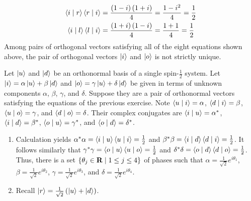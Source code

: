 \begin{answer}
\begin{align*}
		\braket{i \mid r} \braket{r \mid i} & = \frac{\left(1 -i\right)\left(1 + i\right)}{4} = \frac{1 - i^2}{4} = \frac{1}{2}                                                                                                       \\
		\braket{i \mid l} \braket{l \mid i} & = \frac{\left(1 + i\right)\left(1 - i\right)}{4} = \frac{1 + 1}{4} = \frac{1}{2}
	\end{align*}
	Among pairs of orthogonal vectors satisfying all of the eight equations shown above, the pair of orthogonal vectors $\ket{i}$ and $\ket{o}$ is not strictly unique.
\end{answer}

\begin{answer}
	Let $\ket{u}$ and $\ket{d}$ be an orthonormal basis of a single spin-$\frac{1}{2}$ system.
	Let $\ket{i} = \alpha \ket{u} + \beta \ket{d}$ and $\ket{o} = \gamma \ket{u} + \delta \ket{d}$ be given in terms of unknown components $\alpha$, $\beta$, $\gamma$, and $\delta$.
	Suppose they are a pair of orthonormal vectors satisfying the equations of the previous exercise.
	Note $\braket{u \mid i} = \alpha$, $\braket{d \mid i} = \beta$, $\braket{u \mid o} = \gamma$, and $\braket{d \mid o} = \delta$.
	Their complex conjugates are $\braket{i \mid u} = \alpha^*$, $\braket{i \mid d} = \beta^*$, $\braket{o \mid u} = \gamma^*$, and $\braket{o \mid d} = \delta^*$.
	\begin{enumerate}
		\item Calculation yields $\alpha^* \alpha = \braket{i \mid u} \braket{u \mid i} = \frac{1}{2}$ and $\beta^* \beta = \braket{i \mid d} \braket{d \mid i} = \frac{1}{2}$.
		      It follows similarly that $\gamma^* \gamma = \braket{o \mid u} \braket{u \mid o} = \frac{1}{2}$ and $\delta^* \delta = \braket{o \mid d} \braket{d \mid o} = \frac{1}{2}$.
		      Thus, there is a set $\left\{\theta_j \in \mathbf{R} \mid 1 \leq j \leq 4 \right\}$ of phases such that $\alpha = \frac{1}{\sqrt{2}} e^{i \theta_1}$, $\beta = \frac{1}{\sqrt{2}} e^{i \theta_2}$, $\gamma = \frac{1}{\sqrt{2}} e^{i \theta_3}$, and $\delta = \frac{1}{\sqrt{2}} e^{i \theta_4}$.
		\item Recall $\ket{r} = \frac{1}{\sqrt{2}}\left(\ket{u} + \ket{d}\right)$.


\end{enumerate}
\end{answer}
